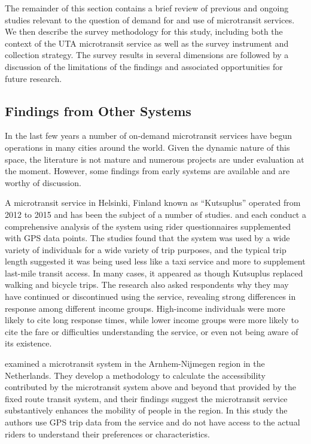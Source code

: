 \documentclass[smartcities,article,submit,moreauthors,pdftex]{mdpi}
\begin{document}
The remainder of this section contains a brief review of previous and ongoing
studies relevant to the question of demand for and use of microtransit services.
We then describe the survey methodology for this study, including both the
context of the UTA microtransit service as well as the survey instrument and
collection strategy. The survey results in several dimensions are followed by a
discussion of the limitations of the findings and associated opportunities for
future research.

\hypertarget{findings-from-other-systems}{%
\subsection{Findings from Other Systems}\label{findings-from-other-systems}}

In the last few years a number of on-demand microtransit services have begun
operations in many cities around the world. Given the dynamic nature of this
space, the literature is not mature and numerous projects are under evaluation
at the moment. However, some findings from early systems are available and are
worthy of discussion.

A microtransit service in Helsinki, Finland known as ``Kutsuplus'' operated from
2012 to 2015 and has been the subject of a number of studies. \citet{weckstrom2018} and
\citet{Haglund2019} each conduct a comprehensive analysis of the system using rider
questionnaires supplemented with GPS data points. The studies found that the
system was used by a wide variety of individuals for a wide variety of trip
purposes, and the typical trip length suggested it was being used less like a
taxi service and more to supplement last-mile transit access. In many cases, it
appeared as though Kutsuplus replaced walking and bicycle trips. The
\citet{weckstrom2018} research also asked respondents why they may have continued or
discontinued using the service, revealing strong differences in response among
different income groups. High-income individuals were more likely to cite long
response times, while lower income groups were more likely to cite the fare or
difficulties understanding the service, or even not being aware of its
existence.

\citet{alonso2018} examined a microtransit system in the Arnhem-Nijmegen region in the
Netherlands. They develop a methodology to calculate the accessibility
contributed by the microtransit system above and beyond that provided by the
fixed route transit system, and their findings suggest the microtransit
service substantively enhances the mobility of people in the region. In this
study the authors use GPS trip data from the service and do not have access to
the actual riders to understand their preferences or characteristics.
\end{document}
